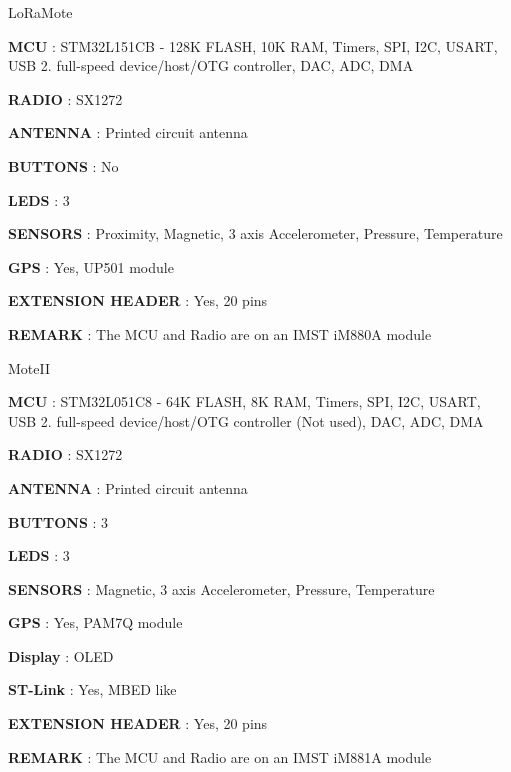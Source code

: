 \begin{DoxyItemize}
\item Lo\+Ra\+Mote
\begin{DoxyItemize}
\item {\bfseries M\+CU} \+: S\+T\+M32\+L151\+CB -\/ 128K F\+L\+A\+SH, 10K R\+AM, Timers, S\+PI, I2C, U\+S\+A\+RT, U\+SB 2. full-\/speed device/host/\+O\+TG controller, D\+AC, A\+DC, D\+MA
\item {\bfseries R\+A\+D\+IO} \+: S\+X1272
\item {\bfseries A\+N\+T\+E\+N\+NA} \+: Printed circuit antenna
\item {\bfseries B\+U\+T\+T\+O\+NS} \+: No
\item {\bfseries L\+E\+DS} \+: 3
\item {\bfseries S\+E\+N\+S\+O\+RS} \+: Proximity, Magnetic, 3 axis Accelerometer, Pressure, Temperature
\item {\bfseries G\+PS} \+: Yes, U\+P501 module
\item {\bfseries E\+X\+T\+E\+N\+S\+I\+ON H\+E\+A\+D\+ER} \+: Yes, 20 pins
\item {\bfseries R\+E\+M\+A\+RK} \+: The M\+CU and Radio are on an I\+M\+ST i\+M880A module
\end{DoxyItemize}
\item Mote\+II
\begin{DoxyItemize}
\item {\bfseries M\+CU} \+: S\+T\+M32\+L051\+C8 -\/ 64K F\+L\+A\+SH, 8K R\+AM, Timers, S\+PI, I2C, U\+S\+A\+RT, U\+SB 2. full-\/speed device/host/\+O\+TG controller (Not used), D\+AC, A\+DC, D\+MA
\item {\bfseries R\+A\+D\+IO} \+: S\+X1272
\item {\bfseries A\+N\+T\+E\+N\+NA} \+: Printed circuit antenna
\item {\bfseries B\+U\+T\+T\+O\+NS} \+: 3
\item {\bfseries L\+E\+DS} \+: 3
\item {\bfseries S\+E\+N\+S\+O\+RS} \+: Magnetic, 3 axis Accelerometer, Pressure, Temperature
\item {\bfseries G\+PS} \+: Yes, P\+A\+M7Q module
\item {\bfseries Display} \+: O\+L\+ED
\item {\bfseries S\+T-\/\+Link} \+: Yes, M\+B\+ED like
\item {\bfseries E\+X\+T\+E\+N\+S\+I\+ON H\+E\+A\+D\+ER} \+: Yes, 20 pins
\item {\bfseries R\+E\+M\+A\+RK} \+: The M\+CU and Radio are on an I\+M\+ST i\+M881A module

\end{DoxyItemize}
\end{DoxyItemize}

